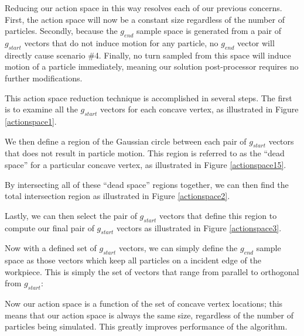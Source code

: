 Reducing our action space in this way resolves each of our previous concerns. First, the action space will now be a constant size regardless of the number of particles. Secondly, because the $g_{end}$ sample space is generated from a pair of $g_{start}$ vectors that do not induce motion for any particle, no $g_{end}$ vector will directly cause scenario \#4. Finally, no turn sampled from this space will induce motion of a particle immediately, meaning our solution post-processor requires no further modifications.

This action space reduction technique is accomplished in several steps. The first is to examine all the $g_{start}$ vectors for each concave vertex, as illustrated in Figure \ref{actionspace1}.


We then define a region of the Gaussian circle between each pair of $g_{start}$ vectors that does not result in particle motion. This region is referred to as the ``dead space'' for a particular concave vertex, as illustrated in Figure \ref{actionspace15}.


By intersecting all of these ``dead space'' regions together, we can then find the total intersection region as illustrated in Figure \ref{actionspace2}.


Lastly, we can then select the pair of $g_{start}$ vectors that define this region to compute our final pair of $g_{start}$ vectors as illustrated in Figure \ref{actionspace3}.


Now with a defined set of $g_{start}$ vectors, we can simply define the $g_{end}$ sample space as those vectors which keep all particles on a incident edge of the workpiece. This is simply the set of vectors that range from parallel to orthogonal from $g_{start}$:


Now our action space is a function of the set of concave vertex locations; this means that our action space is always the same size, regardless of the number of particles being simulated. This greatly improves performance of the algorithm.

